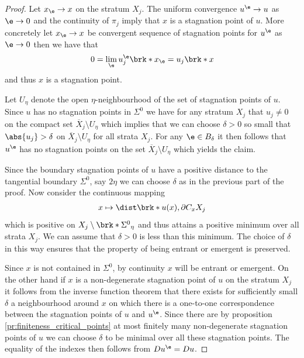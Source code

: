 \begin{proof}
  
  Let $x_\e\to x$ on the stratum $X_j$.
  The uniform convergence $u^\e\to u$ as $\e\to0$ and the continuity of $\pi_j$ 
  imply that $x$ is a stagnation point of $u$.
  More concretely let $x_\e\to x$ be convergent sequence of stagnation points for $u^\e$
  as $\e\to0$ then we have that
  \begin{align}
    0=\lim_\e u_j^\e\brk*{x_\e}
    =u_j\brk*{x}
  \end{align}
  and thus $x$ is a stagnation point.


  Let $U_\eta$ denote the open $\eta$-neighbourhood of the set of stagnation points of $u$.
  Since $u$ has no stagnation points in $\Sigma^0$ we have for any stratum $X_j$ that
  $u_j\neq0$ on the compact set $\overline{X}_j\setminus U_\eta$ which implies that we can choose $\delta>0$ 
  so small that $\abs{u_j}>\delta$ on $\overline{X}_j\setminus U_\eta$
  for all strata $X_j$.
  For any $\e\in B_\delta$ it then follows that $u^\e$ has no stagnation points on the set $\overline{X}_j\setminus U_\eta$
  which yields the claim.

  Since the boundary stagnation points of $u$ have a positive distance to the tangential boundary $\Sigma^0$,
  say $2\eta$ we can choose $\delta$ as in the previous part of the proof. Now consider the continuous mapping
  \begin{align*}
    x\mapsto \dist\brk*{u(x),\partial C_xX_j}
  \end{align*}
  which is positive on $X_j\setminus \brk*{\Sigma^0}_\eta$ and thus attains a positive minimum over all strata $X_j$.
  We can assume that $\delta>0$ is less than this minimum.
  The choice of $\delta$ in this way ensures that the property of being entrant or emergent is preserved.

  Since $x$ is not contained in $\Sigma^0$, by continuity $x$ will
  be entrant or emergent.
  On the other hand if $x$ is a non-degenerate stagnation point of $u$ on the stratum $X_j$ it follows 
  from the inverse function theorem that there exists for sufficiently small $\delta$
  a neighbourhood around $x$ on which there is a one-to-one correspondence between the
  stagnation points of $u$ and $u^\e$.
  Since there are by proposition \ref{pr:finiteness_critical_points} at most finitely many non-degenerate stagnation points of
  $u$ we can choose $\delta$ to be minimal over all these stagnation points.
  The equality of the indexes then follows from $Du^\e=Du$.

\end{proof}

